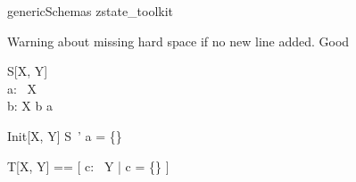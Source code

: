 
\begin{zsection}
   \SECTION genericSchemas \parents zstate\_toolkit
\end{zsection}

Warning about missing hard space if no new line added. Good
\begin{schema}{S}[X, Y]
   \zstate \\
   a: \power~X \\
   b: X
\where
   b \in a
\end{schema}

\begin{schema}{Init}[X, Y]
   S~'
\where
   a = \{\}
\end{schema}

\begin{zed}
   T[X, Y] == [ c: \power~Y | \lnot c = \{\} ]
\end{zed}